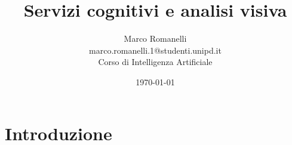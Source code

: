 \documentclass[12pt]{beamer}
\author[Romanelli,Marco]{Marco Romanelli\\[0.5\baselineskip]
\tiny marco.romanelli.1@studenti.unipd.it\\[1.5\baselineskip]
\scriptsize Corso di Intelligenza Artificiale}
\title{Servizi cognitivi e analisi visiva}
\institute{Universit\`a di Padova}
\date{\today}
\begin{document}
\section{Introduzione}\label{sec:intro}
\begin{frame}[t,plain]\titlepage\end{frame}


	\setcounter{framenumber}{0} %
	

\end{document}
